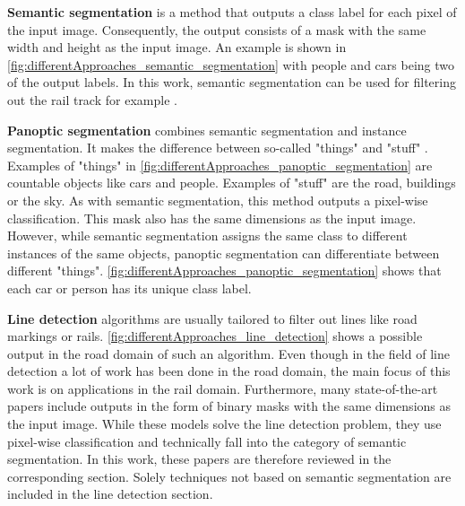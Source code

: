 \vspace{1cm} %

\noindent\textbf{Semantic segmentation} is a method that outputs a class label for each pixel of the input image.
Consequently, the output consists of a mask with the same width and height as the input image.
An example is shown in \autoref{fig:differentApproaches_semantic_segmentation} with people and cars being two of the output labels.
In this work, semantic segmentation can be used for filtering out the rail track for example \cite{panopticsegmentation2019}.

\vspace{1cm} %

\noindent\textbf{Panoptic segmentation} combines semantic segmentation and instance segmentation.
It makes the difference between so-called "things" and "stuff" \cite{panopticsegmentation2019}.
Examples of "things" in \autoref{fig:differentApproaches_panoptic_segmentation} are countable objects like cars and people.
Examples of "stuff" are the road, buildings or the sky.
As with semantic segmentation, this method outputs a pixel-wise classification.
This mask also has the same dimensions as the input image.
However, while semantic segmentation assigns the same class to different instances of the same objects, panoptic segmentation can differentiate between different "things".
\autoref{fig:differentApproaches_panoptic_segmentation} shows that each car or person has its unique class label.

\vspace{1cm} %

\noindent\textbf{Line detection} algorithms are usually tailored to filter out lines like road markings or rails.
\autoref{fig:differentApproaches_line_detection} shows a possible output in the road domain of such an algorithm.
Even though in the field of line detection a lot of work has been done in the road domain, the main focus of this work is on applications in the rail domain.
Furthermore, many state-of-the-art papers include outputs in the form of binary masks with the same dimensions as the input image.
While these models solve the line detection problem, they use pixel-wise classification and technically fall into the category of semantic segmentation.
In this work, these papers are therefore reviewed in the corresponding section.
Solely techniques not based on semantic segmentation are included in the line detection section.

